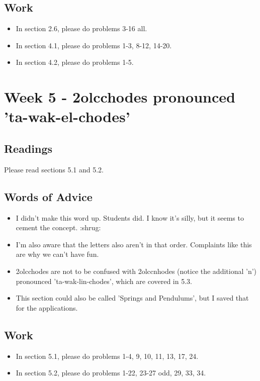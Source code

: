 	\subsection{Work}
		\begin{itemize}
			\item In section 2.6, please do problems 3-16 all.
			\item In section 4.1, please do problems 1-3, 8-12, 14-20.
			\item In section 4.2, please do problems 1-5.
		\end{itemize}

	\clearpage



	\section{Week 5 - 2olcchodes pronounced 'ta-wak-el-chodes'}

	\subsection{Readings}
		Please read sections 5.1 and 5.2.

	\subsection{Words of Advice}
		\begin{itemize}
			\item I didn't make this word up. Students did. I know it's silly, but it seems to cement the concept. :shrug:
			\item I'm also aware that the letters also aren't in that order. Complaints like this are why we can't have fun.
			\item 2olcchodes are not to be confused with 2olccnhodes (notice the additional 'n') pronounced 'ta-wak-lin-chodes', which are covered in 5.3.
			\item This section could also be called 'Springs and Pendulums', but I saved that for the applications.
		\end{itemize}

	\subsection{Work}
		\begin{itemize}
			\item In section 5.1, please do problems 1-4, 9, 10, 11, 13, 17, 24.
			\item In section 5.2, please do problems 1-22, 23-27 odd, 29, 33, 34.
		\end{itemize}

